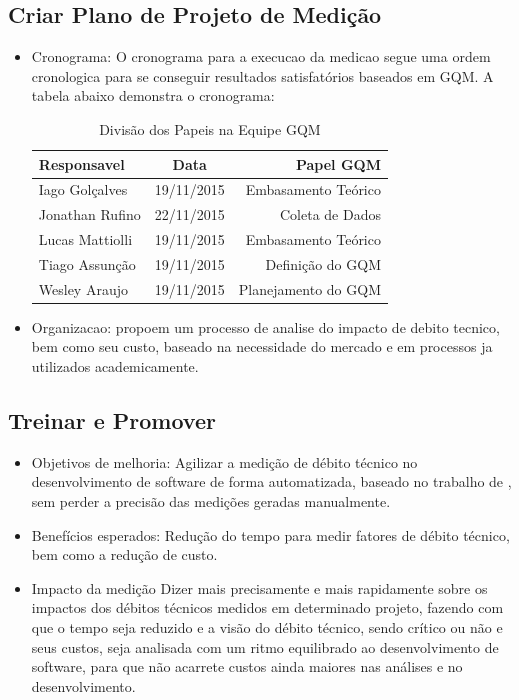 \subsection{Criar Plano de Projeto de Medição}
\begin{itemize}
  \item Cronograma: O cronograma para a execucao da medicao segue uma ordem cronologica
  para se conseguir resultados satisfatórios baseados em GQM. A tabela abaixo demonstra
  o cronograma:

  \begin{table}[ht]
  \caption{Divisão dos Papeis na Equipe GQM}
  \centering
  \begin{tabular}{|l*{1}{c}r|}
  \hline
  Responsavel              & Data & Papel GQM \\
  \hline
  Iago Golçalves & 19/11/2015 &   Embasamento Teórico   \\
  \hline
  Jonathan  Rufino & 22/11/2015 &   Coleta de Dados\\
  \hline
  Lucas Mattiolli & 19/11/2015 &   Embasamento Teórico \\
  \hline
  Tiago Assunção & 19/11/2015 &   Definição do GQM  \\
  \hline
  Wesley Araujo & 19/11/2015 &   Planejamento do GQM \\
  \hline
  \end{tabular}
  \label{table:papeisgqm}
  \end{table}

\item Organizacao: \cite{td} propoem um processo de analise do impacto de debito tecnico,
bem como seu custo, baseado na necessidade do mercado e em processos ja utilizados academicamente.
\end{itemize}

\subsection{Treinar e Promover}
\begin{itemize}
\item Objetivos de melhoria: Agilizar a medição de débito técnico no desenvolvimento de software de forma
automatizada, baseado no trabalho de \cite{td}, sem perder a precisão das medições geradas manualmente.

\item Benefícios esperados: \cite{td} Redução do tempo para medir fatores de débito técnico, bem como a
redução de custo.

\item Impacto da medição \cite{td} Dizer mais precisamente e mais rapidamente sobre os impactos dos débitos
técnicos medidos em determinado projeto, fazendo com que o tempo seja reduzido e a visão do débito técnico, sendo
crítico ou não e seus custos, seja analisada com um ritmo equilibrado ao desenvolvimento de software, para que não acarrete
custos ainda maiores nas análises e no desenvolvimento.

\end{itemize}
